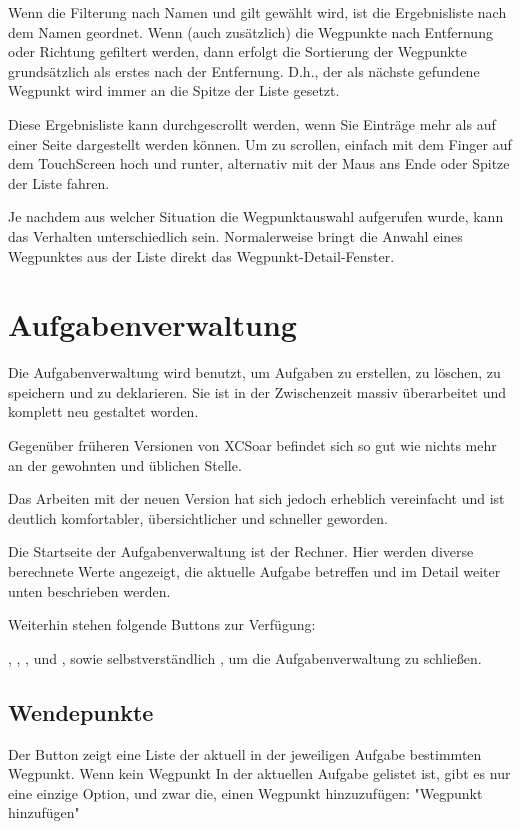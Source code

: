 Wenn die Filterung nach Namen und gilt gewählt wird, ist die Ergebnisliste nach dem Namen geordnet. Wenn (auch zusätzlich) die Wegpunkte nach Entfernung oder Richtung gefiltert werden, dann erfolgt die Sortierung der Wegpunkte grundsätzlich als erstes nach der Entfernung.
D.h., der als nächste gefundene Wegpunkt wird immer an die Spitze der Liste gesetzt.

Diese Ergebnisliste kann durchgescrollt werden, wenn Sie Einträge mehr als auf einer Seite dargestellt werden können. Um zu scrollen, einfach mit dem Finger auf dem TouchScreen hoch und runter, alternativ mit der Maus ans Ende oder Spitze der Liste fahren.

Je nachdem aus welcher Situation die Wegpunktauswahl aufgerufen wurde, kann das Verhalten unterschiedlich sein. Normalerweise bringt die Anwahl eines Wegpunktes aus der Liste  direkt das Wegpunkt-Detail-Fenster.

\section{Aufgabenverwaltung }\label{sec:task-manager-dialog}
Die Aufgabenverwaltung wird benutzt, um Aufgaben zu erstellen, zu löschen, zu speichern und zu deklarieren. 
Sie ist in der Zwischenzeit massiv überarbeitet und komplett neu gestaltet worden.

Gegenüber früheren Versionen von \textsf{XCSoar} befindet sich so gut wie nichts mehr an der gewohnten und üblichen Stelle. 

Das Arbeiten mit der neuen Version hat sich jedoch erheblich vereinfacht und ist deutlich komfortabler, übersichtlicher und schneller geworden.

Die Startseite der Aufgabenverwaltung ist der Rechner. Hier werden diverse berechnete Werte angezeigt, die aktuelle Aufgabe betreffen und im Detail weiter unten beschrieben werden.

Weiterhin stehen folgende Buttons zur Verfügung:

  , , , und , sowie selbstverständlich , um die Aufgabenverwaltung zu schließen.

\subsection*{Wendepunkte}
Der Button   zeigt eine Liste der aktuell in der jeweiligen Aufgabe bestimmten Wegpunkt. Wenn kein Wegpunkt In der aktuellen Aufgabe gelistet ist, gibt es nur eine einzige Option, und zwar die, einen Wegpunkt hinzuzufügen: "Wegpunkt hinzufügen"

